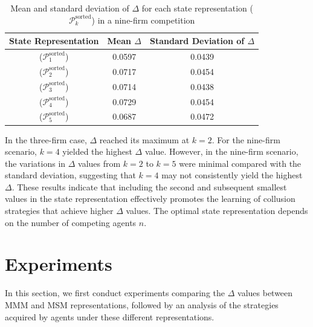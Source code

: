 \documentclass[runningheads]{llncs}
\begin{document}
    \begin{table}[tb]
        \centering
        \caption{Mean and standard deviation of $\Delta$ for each state representation (\( \mathcal{P}^{\text{sorted}}_k \)) in a nine-firm competition}
        \label{tab:result_pre_experiment2_9firm}
        \begin{tabular}{c|cc}
            \hline
            State Representation & Mean $\Delta$ & Standard Deviation of $\Delta$ \\
            \hline
            (\( \mathcal{P}^{\text{sorted}}_1 \)) & 0.0597 & 0.0439 \\
            (\( \mathcal{P}^{\text{sorted}}_2 \)) & 0.0717 & 0.0454 \\
            (\( \mathcal{P}^{\text{sorted}}_3 \)) & 0.0714 & 0.0438 \\
            (\( \mathcal{P}^{\text{sorted}}_4 \)) & 0.0729 & 0.0454 \\
            (\( \mathcal{P}^{\text{sorted}}_5 \)) & 0.0687 & 0.0472 \\
            \hline
        \end{tabular}
    \end{table}

    In the three-firm case, $\Delta$ reached its maximum at $k = 2$. For the nine-firm scenario, $k = 4$ yielded the highest $\Delta$ value.
    However, in the nine-firm scenario, the variations in $\Delta$ values from $k = 2$ to $k = 5$ were minimal compared with the standard deviation,
    suggesting that $k = 4$ may not consistently yield the highest $\Delta$.
    These results indicate that including the second and subsequent smallest values in the state representation effectively promotes the learning of collusion strategies that achieve higher $\Delta$ values.
    The optimal state representation depends on the number of competing agents $n$.


\section{Experiments}\label{sec:experiment}
    In this section, we first conduct experiments comparing the $\Delta$ values between MMM and MSM representations, followed by an analysis of the strategies acquired by agents under these different representations.
\end{document}
